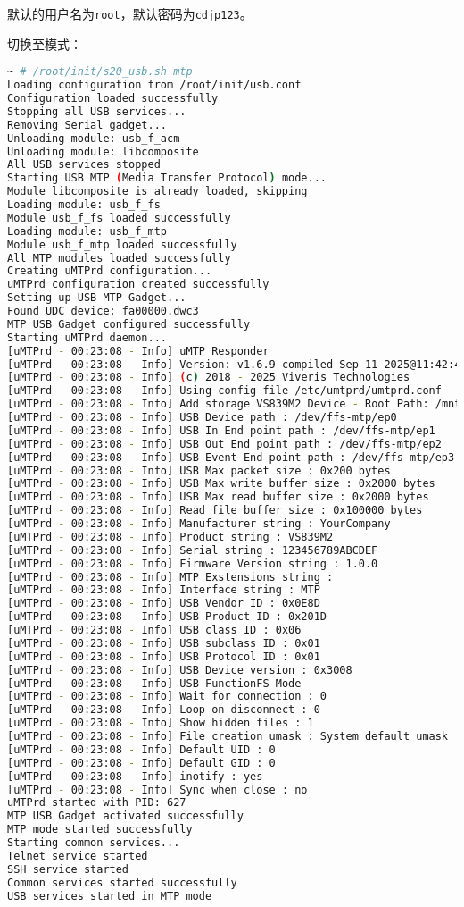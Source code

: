 \documentclass[UTF8]{ctexart}
\newcommand{\code}[1]{\colorbox{gray!10}{\lstinline[style=inlinecode]|#1|}}
\begin{document}
\noindent 默认的用户名为\code{root}，默认密码为\code{cdjp123}。

切换至模式：

\begin{lstlisting}[language=sh]
~ # /root/init/s20_usb.sh mtp
Loading configuration from /root/init/usb.conf
Configuration loaded successfully
Stopping all USB services...
Removing Serial gadget...
Unloading module: usb_f_acm
Unloading module: libcomposite
All USB services stopped
Starting USB MTP (Media Transfer Protocol) mode...
Module libcomposite is already loaded, skipping
Loading module: usb_f_fs
Module usb_f_fs loaded successfully
Loading module: usb_f_mtp
Module usb_f_mtp loaded successfully
All MTP modules loaded successfully
Creating uMTPrd configuration...
uMTPrd configuration created successfully
Setting up USB MTP Gadget...
Found UDC device: fa00000.dwc3
MTP USB Gadget configured successfully
Starting uMTPrd daemon...
[uMTPrd - 00:23:08 - Info] uMTP Responder
[uMTPrd - 00:23:08 - Info] Version: v1.6.9 compiled Sep 11 2025@11:42:40
[uMTPrd - 00:23:08 - Info] (c) 2018 - 2025 Viveris Technologies
[uMTPrd - 00:23:08 - Info] Using config file /etc/umtprd/umtprd.conf
[uMTPrd - 00:23:08 - Info] Add storage VS839M2 Device - Root Path: /mnt/storage - UID: -1 - GID: -1 - Flags: 0x00000000
[uMTPrd - 00:23:08 - Info] USB Device path : /dev/ffs-mtp/ep0
[uMTPrd - 00:23:08 - Info] USB In End point path : /dev/ffs-mtp/ep1
[uMTPrd - 00:23:08 - Info] USB Out End point path : /dev/ffs-mtp/ep2
[uMTPrd - 00:23:08 - Info] USB Event End point path : /dev/ffs-mtp/ep3
[uMTPrd - 00:23:08 - Info] USB Max packet size : 0x200 bytes
[uMTPrd - 00:23:08 - Info] USB Max write buffer size : 0x2000 bytes
[uMTPrd - 00:23:08 - Info] USB Max read buffer size : 0x2000 bytes
[uMTPrd - 00:23:08 - Info] Read file buffer size : 0x100000 bytes
[uMTPrd - 00:23:08 - Info] Manufacturer string : YourCompany
[uMTPrd - 00:23:08 - Info] Product string : VS839M2
[uMTPrd - 00:23:08 - Info] Serial string : 123456789ABCDEF
[uMTPrd - 00:23:08 - Info] Firmware Version string : 1.0.0
[uMTPrd - 00:23:08 - Info] MTP Exstensions string : 
[uMTPrd - 00:23:08 - Info] Interface string : MTP
[uMTPrd - 00:23:08 - Info] USB Vendor ID : 0x0E8D
[uMTPrd - 00:23:08 - Info] USB Product ID : 0x201D
[uMTPrd - 00:23:08 - Info] USB class ID : 0x06
[uMTPrd - 00:23:08 - Info] USB subclass ID : 0x01
[uMTPrd - 00:23:08 - Info] USB Protocol ID : 0x01
[uMTPrd - 00:23:08 - Info] USB Device version : 0x3008
[uMTPrd - 00:23:08 - Info] USB FunctionFS Mode
[uMTPrd - 00:23:08 - Info] Wait for connection : 0
[uMTPrd - 00:23:08 - Info] Loop on disconnect : 0
[uMTPrd - 00:23:08 - Info] Show hidden files : 1
[uMTPrd - 00:23:08 - Info] File creation umask : System default umask
[uMTPrd - 00:23:08 - Info] Default UID : 0
[uMTPrd - 00:23:08 - Info] Default GID : 0
[uMTPrd - 00:23:08 - Info] inotify : yes
[uMTPrd - 00:23:08 - Info] Sync when close : no
uMTPrd started with PID: 627
MTP USB Gadget activated successfully
MTP mode started successfully
Starting common services...
Telnet service started
SSH service started
Common services started successfully
USB services started in MTP mode


\end{lstlisting}
\end{document}
